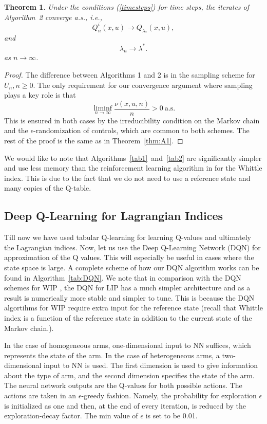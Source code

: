 \documentclass[12pt]{article}
\newtheorem{theorem}{Theorem}[section]
\numberwithin{equation}{section}
\newcommand{\1}{\textbf{1}}
\begin{document}
\begin{theorem}\label{thm:A2}
Under the conditions (\ref{timesteps}) for time steps, 
the iterates of Algorithm~2 converge a.s., i.e.,
$$
Q_n^i(x,u) \rightarrow Q_{\lambda_*}(x,u),
$$
and
$$
\lambda_n \rightarrow \lambda^*.
$$
as $n \rightarrow \infty$.
\end{theorem}

\begin{proof} The difference between Algorithms 1 and 2 is in the sampling scheme for $U_n, n \geq 0$. 
The only requirement for our convergence argument where sampling plays a key role is that
$$\liminf_{n\to\infty}\frac{\nu(x,u,n)}{n} > 0 \ \mbox{a.s.}$$
This is ensured in both cases by the irreducibility condition on the Markov chain and the $\epsilon$-randomization of controls, which are common to both schemes. The rest of the proof is the same as in  Theorem~\ref{thm:A1}.
\end{proof}

We would like to note that Algorithms~\ref{tab1}~and~\ref{tab2} are significantly simpler and use
less memory than the reinforcement learning algorithm in \cite{Avrachenkov2} for the Whittle
index. This is due to the fact that we do not need to use a reference state and many copies
of the Q-table.


\subsection{Deep Q-Learning for Lagrangian Indices}
\label{sec:dqn}

Till now we have used tabular Q-learning for learning Q-values and ultimately the Lagrangian indices. 
Now, let us use the Deep Q-Learning Network (DQN) \cite{Minh1,Mnih2} for approximation of the Q values. 
This will especially be useful in cases where the state space is large. A complete scheme of how our 
DQN algorithm works can be found in Algorithm~\ref{tab:DQN}. We note that in comparison with the DQN schemes for WIP 
\cite{Pagare,Robledo1,Robledo2}, the DQN for LIP has a much simpler architecture and as a result is numerically more stable 
and simpler to tune. This is because the DQN algortihms for WIP \cite{Pagare,Robledo1,Robledo2} require extra input for 
the reference state (recall that Whittle index is a function of the reference state in addition to the current state of the Markov chain.). 

In the case of homogeneous arms, one-dimensional input to NN suffices, which represents the state of the arm. 
In the case of heterogeneous arms, a two-dimensional input to NN is used. The first dimension is used 
to give information about the type of arm, and the second dimension specifies the state of the arm. 
The neural network outputs are the Q-values for both possible actions. The actions are taken in 
an $\epsilon$-greedy fashion. Namely, the probability for exploration $\epsilon$ is initialized 
as one and then, at the end of every iteration, is reduced by the exploration-decay factor. 
The min value of $\epsilon$ is set to be 0.01.
\end{document}
